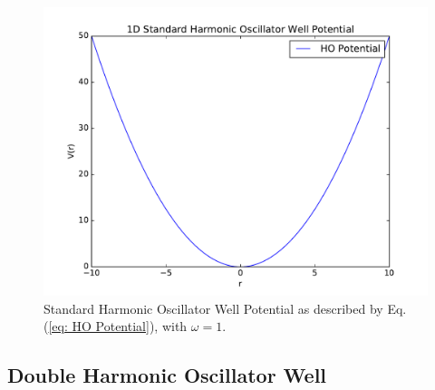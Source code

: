 \documentclass[../main.tex]{subfiles}
\begin{document}
\begin{figure}[!ht]
    \centering
    \includegraphics[scale=0.7]{figures/HO_Potential}
    \caption{Standard Harmonic Oscillator Well Potential as described by Eq.(\ref{eq: HO Potential}), with $\omega = 1$.}
    \label{fig: HO Potential}
\end{figure}



\subsection{Double Harmonic Oscillator Well}
\end{document}
